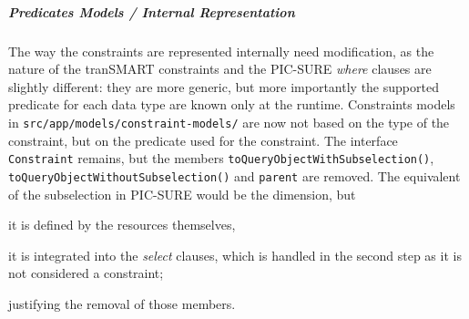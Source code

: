 

\subparagraph{Predicates Models / Internal Representation}

The way the constraints are represented internally need modification, as the nature of the tranSMART constraints and the PIC-SURE \emph{where} clauses are slightly different: they are more generic, but more importantly the supported predicate for each data type are known only at the runtime.
Constraints models in \verb|src/app/models/constraint-models/| are now not based on the type of the constraint, but on the predicate used for the constraint.
The interface \verb|Constraint| remains, but the members \verb|toQueryObjectWithSubselection()|, \verb|toQueryObjectWithoutSubselection()| and \verb|parent| are removed.
The equivalent of the subselection in PIC-SURE would be the dimension, but 
\begin{enumerate*}[label=(\arabic*)]
  \item it is defined by the resources themselves,
  \item it is integrated into the \emph{select} clauses, which is handled in the second step as it is not considered a constraint;
\end{enumerate*}
justifying the removal of those members.

